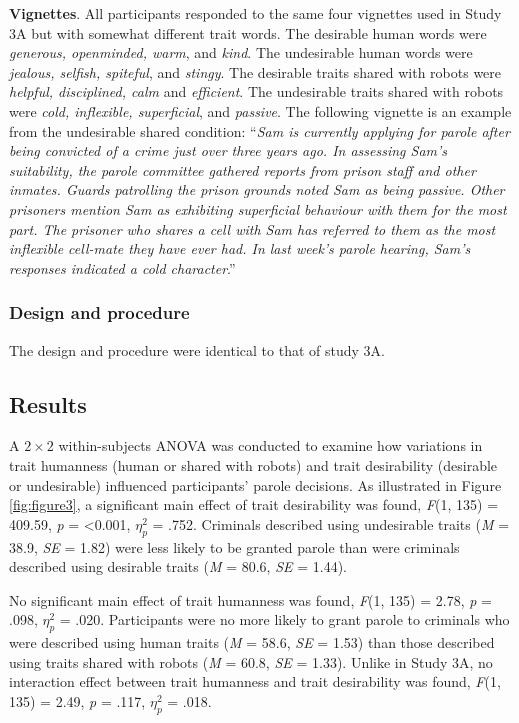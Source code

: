 \documentclass[
]{article}
\begin{document}
\textbf{Vignettes}. All participants responded to the same four vignettes used in Study 3A but with somewhat different trait words. The desirable human words were \emph{generous, openminded, warm}, and \emph{kind}. The undesirable human words were \emph{jealous, selfish, spiteful}, and \emph{stingy}. The desirable traits shared with robots were \emph{helpful, disciplined, calm} and \emph{efficient}. The undesirable traits shared with robots were \emph{cold, inflexible, superficial}, and \emph{passive}. The following vignette is an example from the undesirable shared condition:
``\emph{Sam is currently applying for parole after being convicted of a crime just over three years ago. In assessing Sam's suitability, the parole committee gathered reports from prison staff and other inmates. Guards patrolling the prison grounds noted Sam as being passive. Other prisoners mention Sam as exhibiting superficial behaviour with them for the most part. The prisoner who shares a cell with Sam has referred to them as the most inflexible cell-mate they have ever had. In last week's parole hearing, Sam's responses indicated a cold character}.''

\hypertarget{design-and-procedure}{%
\subsubsection{Design and procedure}\label{design-and-procedure}}

The design and procedure were identical to that of study 3A.

\hypertarget{results-5}{%
\subsection{Results}\label{results-5}}

A \(2 \times 2\) within-subjects ANOVA was conducted to examine how variations in trait humanness (human or shared with robots) and trait desirability (desirable or undesirable) influenced participants' parole decisions. As illustrated in Figure \ref{fig:figure3}, a significant main effect of trait desirability was found, \emph{F}(1, 135) = 409.59, \emph{p} = \textless0.001, \(\eta_{p}^{2}\) = .752. Criminals described using undesirable traits (\emph{M} = 38.9, \emph{SE} = 1.82) were less likely to be granted parole than were criminals described using desirable traits (\emph{M} = 80.6, \emph{SE} = 1.44).

No significant main effect of trait humanness was found, \emph{F}(1, 135) = 2.78, \emph{p} = .098, \(\eta_{p}^{2}\) = .020. Participants were no more likely to grant parole to criminals who were described using human traits (\emph{M} = 58.6, \emph{SE} = 1.53) than those described using traits shared with robots (\emph{M} = 60.8, \emph{SE} = 1.33). Unlike in Study 3A, no interaction effect between trait humanness and trait desirability was found, \emph{F}(1, 135) = 2.49, \emph{p} = .117, \(\eta_{p}^{2}\) = .018.
\end{document}
